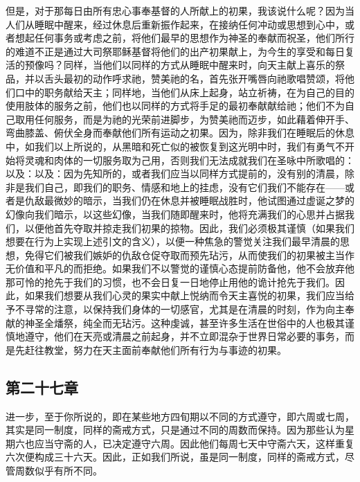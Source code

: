 但是，对于那每日由所有忠心事奉基督的人所献上的初果，我该说什么呢？因为当人们从睡眠中醒来，经过休息后重新振作起来，在接纳任何冲动或思想到心中，或者想起任何事务或考虑之前，将他们最早的思想作为神圣的奉献而祝圣，他们所行的难道不正是通过大司祭耶稣基督将他们的出产初果献上，为今生的享受和每日复活的预像吗？同样，当他们以同样的方式从睡眠中醒来时，向天主献上喜乐的祭品，并以舌头最初的动作呼求祂，赞美祂的名，首先张开嘴唇向祂歌唱赞颂，将他们口中的职务献给天主；同样地，当他们从床上起身，站立祈祷，在为自己的目的使用肢体的服务之前，他们也以同样的方式将手足的最初奉献献给祂；他们不为自己取用任何服务，而是为祂的光荣前进脚步，为赞美祂而迈步，如此藉着伸开手、弯曲膝盖、俯伏全身而奉献他们所有运动之初果。因为，除非我们在睡眠后的休息中，如我们以上所说的，从黑暗和死亡似的被恢复到这光明中时，我们有勇气不开始将灵魂和肉体的一切服务取为己用，否则我们无法成就我们在圣咏中所歌唱的：以及：以及：因为先知所的，或者我们应当以同样方式提前的，没有别的清晨，除非是我们自己，即我们的职务、情感和地上的挂虑，没有它们我们不能存在——或者是仇敌最微妙的暗示，当我们仍在休息并被睡眠战胜时，他试图通过虚诞之梦的幻像向我们暗示，以这些幻像，当我们随即醒来时，他将充满我们的心思并占据我们，以便他首先夺取并掠走我们初果的掠物。因此，我们必须极其谨慎（如果我们想要在行为上实现上述引文的含义），以便一种焦急的警觉关注我们最早清晨的思想，免得它们被我们嫉妒的仇敌仓促夺取而预先玷污，从而使我们的初果被主当作无价值和平凡的而拒绝。如果我们不以警觉的谨慎心态提前防备他，他不会放弃他那可怜的抢先于我们的习惯，也不会日复一日地停止用他的诡计抢先于我们。因此，如果我们想要从我们心灵的果实中献上悦纳而令天主喜悦的初果，我们应当给予不寻常的注意，以保持我们身体的一切感官，尤其是在清晨的时刻，作为向主奉献的神圣全燔祭，纯全而无玷污。这种虔诚，甚至许多生活在世俗中的人也极其谨慎地遵守，他们在天亮或清晨之前起身，并不立即混杂于世界日常必要的事务，而是先赶往教堂，努力在天主面前奉献他们所有行为与事迹的初果。\par


\subsection{第二十七章}

\par

进一步，至于你所说的，即在某些地方四旬期以不同的方式遵守，即六周或七周，其实是同一制度，同样的斋戒方式，只是通过不同的周数而保持。因为那些认为星期六也应当守斋的人，已决定遵守六周。因此他们每周七天中守斋六天，这样重复六次便构成三十六天。因此，正如我们所说，虽是同一制度，同样的斋戒方式，尽管周数似乎有所不同。\par

